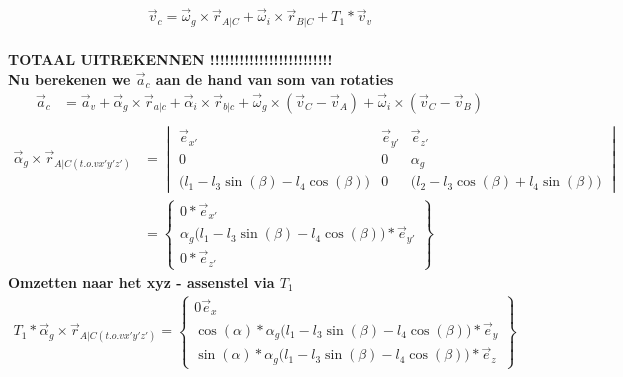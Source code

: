 \documentclass[a4paper,10pt]{article}
\begin{document}
\begin{equation}
	\begin{aligned}
		\vec{v}_{c}=  \vec{\omega}_g \times \vec{r}_{A|C} + \vec{\omega}_i \times \vec{r}_{B|C} +{T}_{1}* \vec{v}_v
	\end{aligned}
\end{equation}\\
\textbf{TOTAAL UITREKENNEN !!!!!!!!!!!!!!!!!!!!!!!!!}\\
\textbf{Nu berekenen we $\vec{a}_c$ aan de hand van som van rotaties} 
\begin{equation}
	\begin{aligned}
		\vec{a}_c &= \vec{a}_v + \vec{\alpha}_g  \times \vec{r}_{a|c} + \vec{\alpha}_i \times \vec{r}_{b|c} + \vec{\omega}_g \times ( \vec{v}_{C} - \vec{v}_{A}) + \vec{\omega}_i \times ( \vec{v}_{C} - \vec{v}_{B})\\
	\end{aligned}
\end{equation}
\begin{equation}
	\begin{aligned}
		\vec{\alpha}_g \times \vec{r}_{A|C(t.o.v x'y'z')}  &=  \begin{vmatrix}
			\vec{e}_{x'}& \vec{e}_{y'} & \vec{e}_{z'}\\
			0 & 0 & \alpha_g \\		
			\Big(l_1 - l_3 \sin(\beta) - l_4 \cos(\beta)\Big) &
			0 & \Big (l_2 - l_3 \cos(\beta) + l_4 \sin(\beta) \Big) 
		\end{vmatrix}\\
		&= \begin{Bmatrix}
			0*\vec{e}_{x'}\\
			\alpha_g \Big(l_1 - l_3 \sin(\beta) - l_4 \cos(\beta)\Big)*\vec{e}_{y'}\\
			0*\vec{e}_{z'}
		\end{Bmatrix}
	\end{aligned}
\end{equation}
\textbf{Omzetten naar het xyz - assenstel via $T_1$}
\begin{equation}
	\begin{aligned}
		{T}_{1}*\vec{\alpha}_g \times \vec{r}_{A|C(t.o.v x'y'z')} = \begin{Bmatrix}
			{0\vec{e}_{x}}\\
			\cos(\alpha)*	\alpha_g \Big(l_1 - l_3 \sin(\beta) - l_4 \cos(\beta)\Big)*\vec{e}_{y}\\
			\sin(\alpha)*	\alpha_g \Big(l_1 - l_3 \sin(\beta) - l_4 \cos(\beta)\Big)*\vec{e}_{z}
		\end{Bmatrix}
	\end{aligned}
\end{equation}\\
\end{document}
